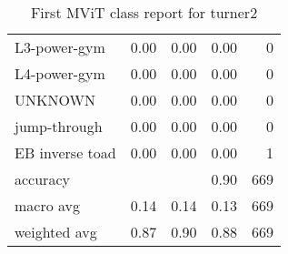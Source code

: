 \begin{table}[h!]
\begin{tabular}{|l|r|r|r|r|}
          L3-power-gym &       0.00 &     0.00 &     0.00 &        0 \\
          L4-power-gym &       0.00 &     0.00 &     0.00 &        0 \\
               UNKNOWN &       0.00 &     0.00 &     0.00 &        0 \\
          jump-through &       0.00 &     0.00 &     0.00 &        0 \\
       EB inverse toad &       0.00 &     0.00 &     0.00 &        1 \\ \hline
              accuracy &            &          &     0.90 &      669 \\
             macro avg &       0.14 &     0.14 &     0.13 &      669 \\
          weighted avg &       0.87 &     0.90 &     0.88 &      669 \\
         \hline
    \end{tabular}
    \caption[Turner 2 class report]{First MViT class report for turner2}
    \label{tbl:mvit-first-class-reports-turner2}
\end{table}

